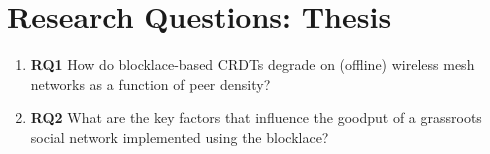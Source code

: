 \section{Research Questions: Thesis}

\begin{frame}
    \begin{enumerate}
        \item \textbf{RQ1} How do blocklace-based CRDTs degrade on (offline) wireless mesh networks as a function of peer density?
        \item \textbf{RQ2} What are the key factors that influence the goodput of a grassroots social network implemented using the blocklace?
    \end{enumerate}
\end{frame}